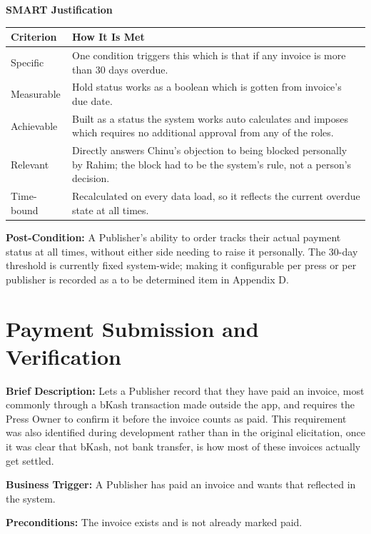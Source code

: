 \documentclass{scrreprt}
\begin{document}
\textbf{SMART Justification}
\begin{longtable}{p{} L{0.82\textwidth}}
\toprule
{} \textbf{Criterion} & \textbf{How It Is Met} \\
\midrule
\endhead
Specific & One condition triggers this which is that if any invoice is more than 30 days overdue. \\
Measurable & Hold status works as a boolean which is gotten from invoice's due date. \\
Achievable & Built as a status the system works auto calculates and imposes which requires no additional approval from any of the roles. \\
Relevant & Directly answers Chinu's objection to being blocked personally by Rahim; the block had to be the system's rule, not a person's decision. \\
Time-bound & Recalculated on every data load, so it reflects the current overdue state at all times. \\
\bottomrule
\end{longtable}

\textbf{Post-Condition:} A Publisher's ability to order tracks their actual payment status at all times, without either side needing to raise it personally. The 30-day threshold is currently fixed system-wide; making it configurable per press or per publisher is recorded as a to be determined item in Appendix D.

\section{Payment Submission and Verification}
\textbf{Brief Description:} Lets a Publisher record that they have paid an invoice, most commonly through a bKash transaction made outside the app, and requires the Press Owner to confirm it before the invoice counts as paid. This requirement was also identified during development rather than in the original elicitation, once it was clear that bKash, not bank transfer, is how most of these invoices actually get settled.

\textbf{Business Trigger:} A Publisher has paid an invoice and wants that reflected in the system.

\textbf{Preconditions:} The invoice exists and is not already marked paid.
\end{document}
